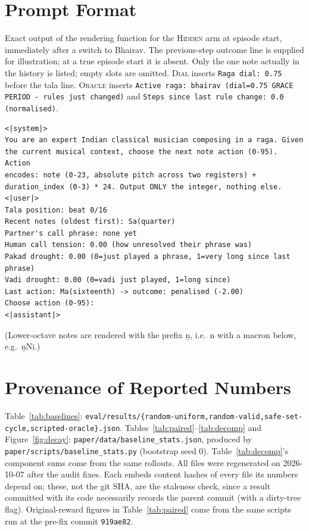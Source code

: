 \documentclass[11pt]{article}
\newcommand{\hidden}{\textsc{Hidden}}
\newcommand{\dial}{\textsc{Dial}}
\newcommand{\oracle}{\textsc{Oracle}}
\begin{document}
\section{Prompt Format}
\label{app:prompt}
Exact output of the rendering function for the \hidden{} arm at episode start, immediately after a switch to Bhairav. The previous-step outcome line is supplied for illustration; at a true episode start it is absent. Only the one note actually in the history is listed; empty slots are omitted. \dial{} inserts \texttt{Raga dial: 0.75} before the tala line. \oracle{} inserts \texttt{Active raga: bhairav (dial=0.75 GRACE PERIOD - rules just changed)} and \texttt{Steps since last rule change: 0.0 (normalised)}.
\begin{verbatim}
<|system|>
You are an expert Indian classical musician composing in a raga. Given
the current musical context, choose the next note action (0-95). Action
encodes: note (0-23, absolute pitch across two registers) +
duration_index (0-3) * 24. Output ONLY the integer, nothing else.
<|user|>
Tala position: beat 0/16
Recent notes (oldest first): Sa(quarter)
Partner's call phrase: none yet
Human call tension: 0.00 (how unresolved their phrase was)
Pakad drought: 0.00 (0=just played a phrase, 1=very long since last phrase)
Vadi drought: 0.00 (0=vadi just played, 1=long since)
Last action: Ma(sixteenth) -> outcome: penalised (-2.00)
Choose action (0-95):
<|assistant|>
\end{verbatim}
(Lower-octave notes are rendered with the prefix \b{n}, i.e.\ n with a macron below, e.g.\ \b{n}Ni.)

\section{Provenance of Reported Numbers}
\label{app:provenance}
Table~\ref{tab:baselines}: \texttt{eval/results/\{random-uniform,random-valid,safe-set-cycle,scripted-oracle\}.json}. Tables~\ref{tab:paired}--\ref{tab:decomp} and Figure~\ref{fig:decay}: \texttt{paper/data/baseline\_stats.json}, produced by \texttt{paper/scripts/baseline\_stats.py} (bootstrap seed 0). Table~\ref{tab:decomp}'s component sums come from the same rollouts. All files were regenerated on 2026-10-07 after the audit fixes. Each embeds content hashes of every file its numbers depend on; these, not the git SHA, are the staleness check, since a result committed with its code necessarily records the parent commit (with a dirty-tree flag). Original-reward figures in Table~\ref{tab:paired} come from the same scripts run at the pre-fix commit \texttt{919ae82}.
\end{document}
